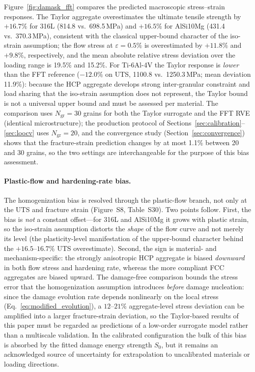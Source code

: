 Figure~\ref{fig:damask_fft} compares the predicted macroscopic stress--strain responses. The Taylor aggregate overestimates the ultimate tensile strength by $+16.7\%$ for 316L (814.8 vs.\ 698.5\,MPa) and $+16.5\%$ for AlSi10Mg (431.4 vs.\ 370.3\,MPa), consistent with the classical upper-bound character of the iso-strain assumption; the flow stress at $\varepsilon=0.5\%$ is overestimated by $+11.8\%$ and $+9.8\%$, respectively, and the mean absolute relative stress deviation over the loading range is 19.5\% and 15.2\%. For Ti-6Al-4V the Taylor response is \emph{lower} than the FFT reference ($-12.0\%$ on UTS, 1100.8 vs.\ 1250.3\,MPa; mean deviation 11.9\%): because the HCP aggregate develops strong inter-granular constraint and load sharing that the iso-strain assumption does not represent, the Taylor bound is not a universal upper bound and must be assessed per material. The comparison uses $N_{\mathrm{gr}} = 30$ grains for both the Taylor surrogate and the FFT RVE (identical microstructure); the production protocol of Sections~\ref{sec:calibration}--\ref{sec:loocv} uses $N_{\mathrm{gr}} = 20$, and the convergence study (Section~\ref{sec:convergence}) shows that the fracture-strain prediction changes by at most 1.1\% between 20 and 30 grains, so the two settings are interchangeable for the purpose of this bias assessment.
\paragraph{Plastic-flow and hardening-rate bias.} The homogenization bias is resolved through the plastic-flow branch, not only at the UTS and fracture strain (Figure~S8, Table~S30). Two points follow. First, the bias is \emph{not} a constant offset---for 316L and AlSi10Mg it grows with plastic strain, so the iso-strain assumption distorts the \emph{shape} of the flow curve and not merely its level (the plasticity-level manifestation of the upper-bound character behind the $+16.5$--$16.7\%$ UTS overestimate). Second, the sign is material- and mechanism-specific: the strongly anisotropic HCP aggregate is biased \emph{downward} in both flow stress and hardening rate, whereas the more compliant FCC aggregates are biased upward.
The damage-free comparison bounds the stress error that the homogenization assumption introduces \emph{before} damage nucleation: since the damage evolution rate depends nonlinearly on the local stress (Eq.~\eqref{eq:modified_evolution}), a $12$--$21\%$ aggregate-level stress deviation can be amplified into a larger fracture-strain deviation, so the Taylor-based results of this paper must be regarded as predictions of a low-order surrogate model rather than a multiscale validation. In the calibrated configuration the bulk of this bias is absorbed by the fitted damage energy strength $S_0$, but it remains an acknowledged source of uncertainty for extrapolation to uncalibrated materials or loading directions.


